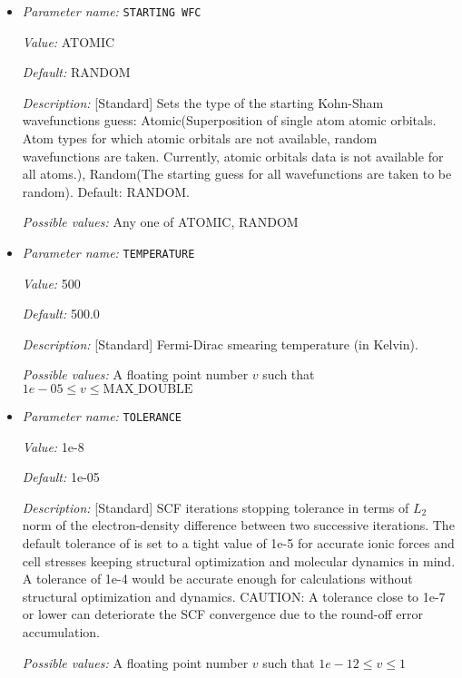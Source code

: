 \begin{itemize}
{\it Default:} 0.0


{\it Description:} [Standard] Mixing parameter to be used in density mixing schemes. For default value of 0.0, it is heuristically set for different mixing schemes (0.2 for Anderson and Broyden, and 0.5 for Kerker and LRD.


{\it Possible values:} A floating point number $v$ such that $-1e-12 \leq v \leq 1$
\item {\it Parameter name:} {\tt STARTING WFC}
\label{parameters:SCF parameters/STARTING WFC}
\label{parameters:SCF_20parameters/STARTING_20WFC}


{\it Value:} ATOMIC


{\it Default:} RANDOM


{\it Description:} [Standard] Sets the type of the starting Kohn-Sham wavefunctions guess: Atomic(Superposition of single atom atomic orbitals. Atom types for which atomic orbitals are not available, random wavefunctions are taken. Currently, atomic orbitals data is not available for all atoms.), Random(The starting guess for all wavefunctions are taken to be random). Default: RANDOM.


{\it Possible values:} Any one of ATOMIC, RANDOM
\item {\it Parameter name:} {\tt TEMPERATURE}
\label{parameters:SCF parameters/TEMPERATURE}
\label{parameters:SCF_20parameters/TEMPERATURE}


{\it Value:} 500


{\it Default:} 500.0


{\it Description:} [Standard] Fermi-Dirac smearing temperature (in Kelvin).


{\it Possible values:} A floating point number $v$ such that $1e-05 \leq v \leq \text{MAX\_DOUBLE}$
\item {\it Parameter name:} {\tt TOLERANCE}
\label{parameters:SCF parameters/TOLERANCE}
\label{parameters:SCF_20parameters/TOLERANCE}


{\it Value:} 1e-8


{\it Default:} 1e-05


{\it Description:} [Standard] SCF iterations stopping tolerance in terms of $L_2$ norm of the electron-density difference between two successive iterations. The default tolerance of is set to a tight value of 1e-5 for accurate ionic forces and cell stresses keeping structural optimization and molecular dynamics in mind. A tolerance of 1e-4 would be accurate enough for calculations without structural optimization and dynamics. CAUTION: A tolerance close to 1e-7 or lower can deteriorate the SCF convergence due to the round-off error accumulation.


{\it Possible values:} A floating point number $v$ such that $1e-12 \leq v \leq 1$
\end{itemize}



